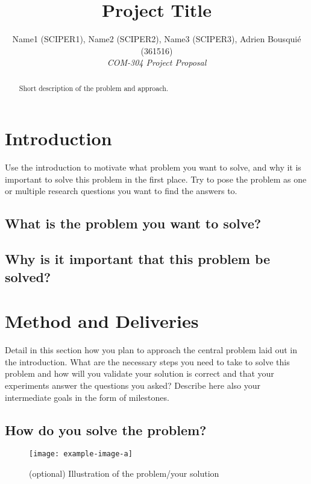 \documentclass[10pt,conference,compsocconf]{IEEEtran}
\begin{document}
\title{Project Title}

\author{
  Name1 (SCIPER1), Name2 (SCIPER2), Name3 (SCIPER3), Adrien Bousquié (361516)\\
  \textit{COM-304 Project Proposal}
}

\maketitle

\begin{abstract}
    Short description of the problem and approach.
\end{abstract}


\section{Introduction}
Use the introduction to motivate what problem you want to solve, and why it is important to solve this problem in the first place.
Try to pose the problem as one or multiple research questions you want to find the answers to.

\subsection{What is the problem you want to solve?}

\subsection{Why is it important that this problem be solved?}


\section{Method and Deliveries}
Detail in this section how you plan to approach the central problem laid out in the introduction.
What are the necessary steps you need to take to solve this problem and how will you validate your solution is correct and that your experiments answer the questions you asked?
Describe here also your intermediate goals in the form of milestones.

\subsection{How do you solve the problem?}
\begin{figure}[tbph]
  \centering
  \texttt{[image: example-image-a]}
  \caption{(optional) Illustration of the problem/your solution}
  \vspace{-3mm}
  \label{fig:placeholder1}
\end{figure}
\end{document}

